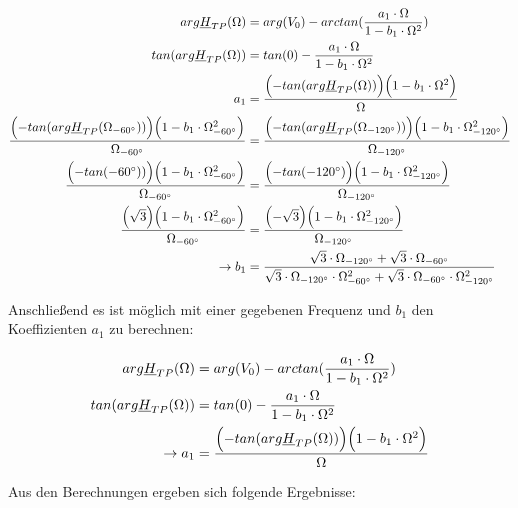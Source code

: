 \small{
\begin{alignat*}{2}
arg\underline{H}_{TP}(\Omega) &= arg(V_0) - arctan(\frac{a_1 \cdot \Omega}{1-b_1\cdot \Omega^2}) \\
tan(arg\underline{H}_{TP}(\Omega)) &= tan(0) - \frac{a_1 \cdot \Omega}{1-b_1\cdot \Omega^2}\\
a_1 &= \frac{\Bigl(- tan(arg\underline{H}_{TP}(\Omega))\Bigr)\Bigl(1-b_1 \cdot \Omega^2\Bigr)}{\Omega}\\
\frac{\Bigl(- tan(arg\underline{H}_{TP}(\Omega_{-60^\circ}))\Bigr)\Bigl(1-b_1 \cdot \Omega_{-60^\circ}^2\Bigr)}{\Omega_{-60^\circ}} &= \frac{\Bigl(- tan(arg\underline{H}_{TP}(\Omega_{-120^\circ}))\Bigr)\Bigl(1-b_1 \cdot \Omega_{-120^\circ}^2\Bigr)}{\Omega_{-120^\circ}}\\
\frac{\Bigl(- tan(-60^\circ))\Bigr)\Bigl(1-b_1 \cdot \Omega_{-60^\circ}^2\Bigr)}{\Omega_{-60^\circ}} &= \frac{\Bigl(- tan(-120^\circ)\Bigr)\Bigl(1-b_1 \cdot \Omega_{-120^\circ}^2\Bigr)}{\Omega_{-120^\circ}}\\
\frac{\Bigl( \sqrt{3} \Bigr)\Bigl(1-b_1 \cdot \Omega_{-60^\circ}^2\Bigr)}{\Omega_{-60^\circ}} &= \frac{\Bigl(-\sqrt{3}\Bigr)\Bigl(1-b_1 \cdot \Omega_{-120^\circ}^2\Bigr)}{\Omega_{-120^\circ}}\\
\rightarrow b_1 &= \frac{\sqrt{3}\cdot \Omega_{-120^\circ}+\sqrt{3}\cdot \Omega_{-60^\circ}}
{\sqrt{3}\cdot \Omega_{-120^\circ}\cdot \Omega_{-60^\circ}^2 +\sqrt{3}\cdot \Omega_{-60^\circ}\cdot \Omega_{-120^\circ}^2}
\end{alignat*}}

\newpage

\noindent Anschließend es ist möglich mit einer gegebenen Frequenz und $b_1$ den Koeffizienten $a_1$ zu berechnen:

\small{
	\begin{alignat*}{2}
	arg\underline{H}_{TP}(\Omega) &= arg(V_0) - arctan(\frac{a_1 \cdot \Omega}{1-b_1\cdot \Omega^2}) \\
	tan(arg\underline{H}_{TP}(\Omega)) &= tan(0) - \frac{a_1 \cdot \Omega}{1-b_1\cdot \Omega^2}\\
	\rightarrow a_1 &= \frac{\Bigl(- tan(arg\underline{H}_{TP}(\Omega))\Bigr)\Bigl(1-b_1 \cdot \Omega^2\Bigr)}{\Omega}\\
	\end{alignat*}}

\noindent Aus den Berechnungen ergeben sich folgende Ergebnisse: \\

